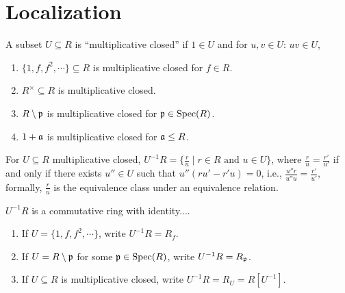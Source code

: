 \chapter{Localization}

\begin{recall}
    A subset $U \subseteq R$ is ``multiplicative closed'' if $1 \in U$ and for $u,v \in U$: $uv \in U$, 
\end{recall}

\begin{example}
    \begin{enumerate}
        \item $\{1,f,f^2,\cdots\} \subseteq R$ is multiplicative closed for $f \in R$.
        \item $R^\times \subseteq R$ is multiplicative closed.
        \item $R \setminus \mathfrak{p}$ is multiplicative closed for $\mathfrak{p} \in \operatorname{Spec}(R)$.
        \item $1 + \mathfrak{a}$ is multiplicative closed for $\mathfrak{a} \leq R$.
    \end{enumerate}
\end{example}

\begin{recall}
    For $U \subseteq R$ multiplicative closed, $U^{-1}R = \{\frac{r}{u} \mid r \in R \text{ and }u \in U\}$, where $\frac{r}{u} = \frac{r'}{u'}$ if and only if there exists $u'' \in U$ such that $u''(ru'-r'u) = 0$, i.e., $\frac{u''r}{u''u} = \frac{r'}{u'}$, formally, $\frac{r}{u}$ is the equivalence class under an equivalence relation. \par 
    $U^{-1}R$ is a commutative ring with identity.... 
\end{recall}

\begin{notation}
    \begin{enumerate}
        \item If $U = \{1,f,f^2,\cdots\}$, write $U^{-1}R = R_f$.
        \item If $U = R \setminus \mathfrak{p}$ for some $\mathfrak{p} \in \operatorname{Spec}(R)$, write $U^{-1}R = R_{\mathfrak{p}}$.
        \item If $U \subseteq R$ is multiplicative closed, write $U^{-1}R = R_U = R[U^{-1}]$.
    \end{enumerate}
\end{notation}

\begin{recall}
\end{recall}

